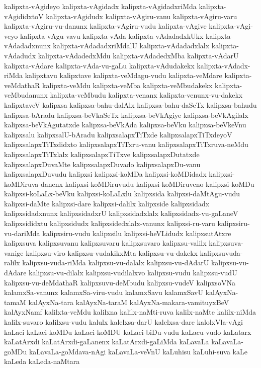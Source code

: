 {kalipxta-vAgideyo
kalipxta-vAgidadx
kalipxta-vAgidadxriMda
kalipxta-vAgididxtoV
kalipxta-vAgidudx
kalipxta-vAgiru-vanu
kalipxta-vAgiru-varu
kalipxta-vAgiru-vu-danunx
kalipxta-vAgiru-vudu
kalipxta-vAgive
kalipxta-vAgi-veyo
kalipxta-vAgu-vavu
kalipxta-vAda
kalipxta-vAdadadxkUkx
kalipxta-vAdadadxnunx
kalipxta-vAdadadxriMdalU
kalipxta-vAdadadxlalx
kalipxta-vAdadudx
kalipxta-vAdadedxMdu
kalipxta-vAdadedxMba
kalipxta-vAdarU
kalipxta-vAdare
kalipxta-vAda-vu-gaLu
kalipxta-vAdudakekx
kalipxta-vAdadx-riMda
kalipxtavu
kalipxtave
kalipxta-veMdagu-vudu
kalipxta-veMdare
kalipxta-veMdathaR
kalipxta-veMdu
kalipxta-veMba
kalipxta-veMbudakekx
kalipxta-veMbudanunx
kalipxta-veMbudu
kalipxta-venanx
kalipxta-venunx-vu-dakekx
kalipxtaveV
kalipxsa
kalipxsa-bahu-dalAlx
kalipxsa-bahu-daSeTx
kalipxsa-bahudu
kalipxsa-bAradu
kalipxsa-beVkaSeTx
kalipxsa-beVkAgiye
kalipxsa-beVkAgilalx
kalipxsa-beVkAgutatxde
kalipxsa-beVkAda
kalipxsa-beVku
kalipxsa-beVkeVnu
kalipxsalu
kalipxsalU-bAradu
kalipxsalapxTiTxde
kalipxsalapxTiTxdeyoV
kalipxsalapxTiTxdidxto
kalipxsalapxTiTxru-vanu
kalipxsalapxTiTxruva-neMdu
kalipxsalapxTiTxlalx
kalipxsalapxTiTxve
kalipxsalapxDutatxde
kalipxsalapxDuvaMte
kalipxsalapxDuvado
kalipxsalapxDu-vanu
kalipxsalapxDuvudu
kalipxsi
kalipxsi-koMDa
kalipxsi-koMDidadx
kalipxsi-koMDiruva-danenx
kalipxsi-koMDiruvudu
kalipxsi-koMDiruveno
kalipxsi-koMDu
kalipxsi-koLaLx-beVku
kalipxsi-koLaLxlu
kalipxsida
kalipxsi-daMtAgu-vudu
kalipxsi-daMte
kalipxsi-dare
kalipxsi-dalilx
kalipxside
kalipxsidadx
kalipxsidadxnunx
kalipxsidadxrU
kalipxsidadxlalx
kalipxsidadx-vu-gaLaneV
kalipxsididxtu
kalipxsidudx
kalipxsidedxlalx-vanunx
kalipxsi-ru-varu
kalipxsiru-vu-dariMda
kalipxsiru-vudu
kalipxsilu
kalipxsi-heVLidudx
kalipxsutAtxre
kalipxsuva
kalipxsuvanu
kalipxsuvaru
kalipxsuvaro
kalipxsu-valilx
kalipxsuva-vanige
kalipxsu-viro
kalipxsu-vudakikxMta
kalipxsu-vu-dakekx
kalipxsuvuda-ralilx
kalipxsu-vuda-riMda
kalipxsu-vu-dalalx
kalipxsu-vu-dAdarU
kalipxsu-vu-dAdare
kalipxsu-vu-dilalx
kalipxsu-vudilalxvo
kalipxsu-vudu
kalipxsu-vudU
kalipxsu-vu-deMdathaR
kalipxsuvu-deMbudu
kalipxsu-vudeV
kalipxsoVNa
kalamxSa-vanunx
kalamxSa-viru-vudu
kalamxSavu
kalamxSavU
kalAyxNa-tamaM
kalAyxNa-tara
kalAyxNa-taraM
kalAyxNa-makara-vamituyxBeV
kalAyxNamf
kalilxta-veMdu
kalilxna
kalilx-naMti-ruva
kalilx-naMte
kalilx-niMda
kalilx-suvaro
kalilxsu-vudu
kalulx
kalelxsa-darU
kalelxsa-dare
kalolxVla-vAgi
kaLaci
kaLaci-koMDu
kaLaci-koMDU
kaLaci-biDu-vudu
kaLacu-vudo
kaLatarx
kaLatArxdi
kaLatArxdi-gaLanenx
kaLatArxdi-gaLiMda
kaLavaLa
kaLavaLa-goMDu
kaLavaLa-goMdava-nAgi
kaLavaLa-veVnU
kaLuhisu
kaLuhi-suva
kaLe
kaLeda
kaLeda-naMtara
}
